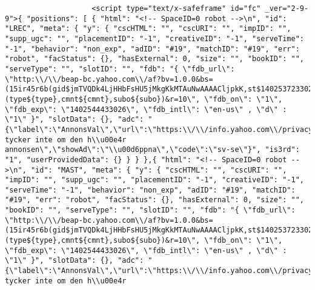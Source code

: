 \begin{verbatim}
                    <script type="text/x-safeframe" id="fc" _ver="2-9-9">{ "positions": [ { "html": "<!-- SpaceID=0 robot -->\n", "id": "LREC", "meta": { "y": { "cscHTML": "", "cscURI": "", "impID": "", "supp_ugc": "", "placementID": "-1", "creativeID": "-1", "serveTime": "-1", "behavior": "non_exp", "adID": "#19", "matchID": "#19", "err": "robot", "facStatus": {}, "hasExternal": 0, "size": "", "bookID": "", "serveType": "", "slotID": "", "fdb": "{ \"fdb_url\": \"http:\\/\\/beap-bc.yahoo.com\\/af?bv=1.0.0&bs=(15ir45r6b(gid$jmTVQDk4LjHHbFsHU5jMkgKkMTAuNwAAAACljpkK,st$1402537233026922,srv$1,si$13303551,adv$25941429036,ct$25,li$3239250051,exp$1402544433026922,cr$4154984551,pbid$25372728133,v$1.0))&al=(type${type},cmnt${cmnt},subo${subo})&r=10\", \"fdb_on\": \"1\", \"fdb_exp\": \"1402544433026\", \"fdb_intl\": \"en-us\" , \"d\" : \"1\" }", "slotData": {}, "adc": "{\"label\":\"AnnonsVal\",\"url\":\"https:\\/\\/info.yahoo.com\\/privacy\\/se\\/yahoo\\/relevantads.html\",\"close\":\"St\\u00e4ng\",\"closeAd\":\"St\\u00e4ng\",\"collapse\":\"Komprimera\",\"fdb\":\"Jag tycker inte om den h\\u00e4r annonsen\",\"showAd\":\"\\u00d6ppna\",\"code\":\"sv-se\"}", "is3rd": "1", "userProvidedData": {} } } },{ "html": "<!-- SpaceID=0 robot -->\n", "id": "MAST", "meta": { "y": { "cscHTML": "", "cscURI": "", "impID": "", "supp_ugc": "", "placementID": "-1", "creativeID": "-1", "serveTime": "-1", "behavior": "non_exp", "adID": "#19", "matchID": "#19", "err": "robot", "facStatus": {}, "hasExternal": 0, "size": "", "bookID": "", "serveType": "", "slotID": "", "fdb": "{ \"fdb_url\": \"http:\\/\\/beap-bc.yahoo.com\\/af?bv=1.0.0&bs=(15ir45r6b(gid$jmTVQDk4LjHHbFsHU5jMkgKkMTAuNwAAAACljpkK,st$1402537233026922,srv$1,si$13303551,adv$25941429036,ct$25,li$3239250051,exp$1402544433026922,cr$4154984551,pbid$25372728133,v$1.0))&al=(type${type},cmnt${cmnt},subo${subo})&r=10\", \"fdb_on\": \"1\", \"fdb_exp\": \"1402544433026\", \"fdb_intl\": \"en-us\" , \"d\" : \"1\" }", "slotData": {}, "adc": "{\"label\":\"AnnonsVal\",\"url\":\"https:\\/\\/info.yahoo.com\\/privacy\\/se\\/yahoo\\/relevantads.html\",\"close\":\"St\\u00e4ng\",\"closeAd\":\"St\\u00e4ng\",\"collapse\":\"Komprimera\",\"fdb\":\"Jag tycker inte om den h\\u00e4r 
\end{verbatim}
